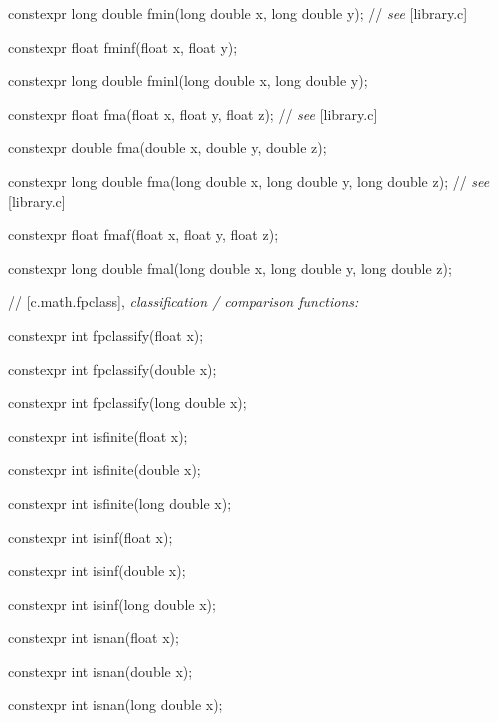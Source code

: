 \documentclass[prd,twocolumn,amsmath,amssymb,nofootinbib,eqsecnum]{revtex4-1}
\newcommand{\highlight}[1]{{\color{red} #1}}
\newcommand{\stdcomment}[1]{{// {\em see} [#1]}}
\begin{document}
{\highlight{constexpr}  long double fmin(long double x, long double y); \stdcomment{library.c}

\highlight{constexpr}  float fminf(float x, float y);

\highlight{constexpr} long double fminl(long double x, long double y);

\vspace{2ex}

\highlight{constexpr}  float fma(float x, float y, float z); \stdcomment{library.c}

\highlight{constexpr}  double fma(double x, double y, double z);

\highlight{constexpr}  long double fma(long double x, long double y, long double z); \stdcomment{library.c}

\highlight{constexpr}  float fmaf(float x, float y, float z);

\highlight{constexpr}  long double fmal(long double x, long double y, long double z);

\vspace{2ex}

// [c.math.fpclass], {\em classification / comparison functions:}

\highlight{constexpr} int fpclassify(float x);

\highlight{constexpr} int fpclassify(double x);

\highlight{constexpr} int fpclassify(long double x);

\vspace{2ex}

\highlight{constexpr} int isfinite(float x);

\highlight{constexpr} int isfinite(double x);

\highlight{constexpr} int isfinite(long double x);

\vspace{2ex}

\highlight{constexpr} int isinf(float x);

\highlight{constexpr} int isinf(double x);

\highlight{constexpr} int isinf(long double x);

\vspace{2ex}

\highlight{constexpr} int isnan(float x);

\highlight{constexpr} int isnan(double x);

\highlight{constexpr} int isnan(long double x);

\vspace{2ex}

}
\end{document}
